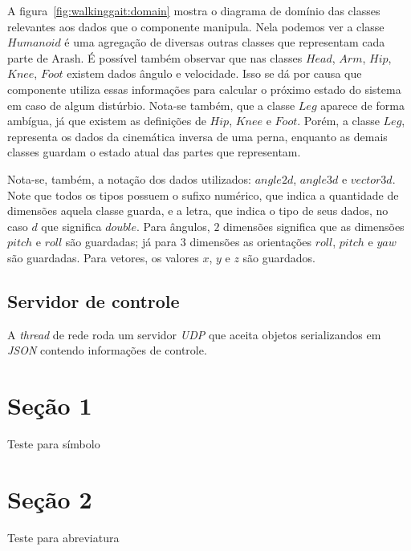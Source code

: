 A figura~\ref{fig:walkinggait:domain} mostra o diagrama de domínio das classes relevantes aos dados que o componente manipula. Nela podemos ver a classe $Humanoid$ é uma agregação de diversas outras classes que representam cada parte de Arash. É possível também observar que nas classes $Head$, $Arm$, $Hip$, $Knee$, $Foot$ existem dados ângulo e velocidade. Isso se dá por causa que componente utiliza essas informações para calcular o próximo estado do sistema em caso de algum distúrbio. Nota-se também, que a classe $Leg$ aparece de forma ambígua, já que existem as definições de $Hip$, $Knee$ e $Foot$. Porém, a classe $Leg$, representa os dados da cinemática inversa de uma perna, enquanto as demais classes guardam o estado atual das partes que representam.

Nota-se, também, a notação dos dados utilizados: $angle2d$, $angle3d$ e $vector3d$. Note que todos os tipos possuem o sufixo numérico, que indica a quantidade de dimensões aquela classe guarda, e a letra, que indica o tipo de seus dados, no caso $d$ que significa $double$. Para ângulos, $2$ dimensões significa que as dimensões $pitch$ e $roll$ são guardadas; já para $3$ dimensões as orientações $roll$, $pitch$ e $yaw$ são guardadas. Para vetores, os valores $x$, $y$ e $z$ são guardados.



\subsection{Servidor de controle}

A \textit{thread} de rede roda um servidor \textit{UDP} que aceita objetos serializandos em \textit{JSON} contendo informações de controle.




\section{Seção 1}
\label{sec:Orientacao}

Teste para símbolo



\section{Seção 2}

Teste para abreviatura 



